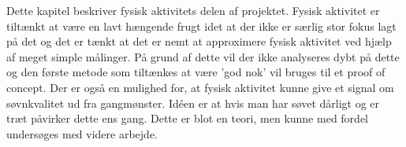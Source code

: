 Dette kapitel beskriver fysisk aktivitets delen af projektet.
Fysisk aktivitet er tiltænkt at være en lavt hængende frugt idet at der ikke er særlig stor fokus lagt på det og det er tænkt at det er nemt at approximere fysisk aktivitet ved hjælp af meget simple målinger.
På grund af dette vil der ikke analyseres dybt på dette og den første metode som tiltænkes at være 'god nok' vil bruges til et proof of concept.
Der er også en mulighed for, at fysisk aktivitet kunne give et signal om søvnkvalitet ud fra gangmønster.
Idéen er at hvis man har søvet dårligt og er træt påvirker dette ens gang.
Dette er blot en teori, men kunne med fordel undersøges med videre arbejde.